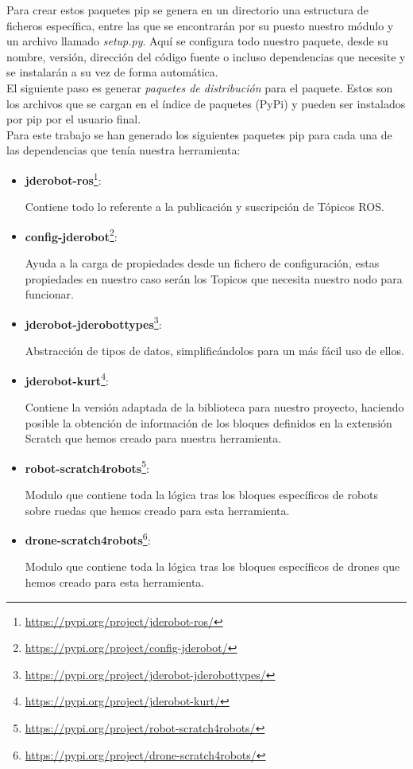Para crear estos paquetes pip se genera en un directorio una estructura de ficheros específica, entre las que se encontrarán por su puesto nuestro módulo y un archivo llamado \textit{setup.py}. Aquí se configura todo nuestro paquete, desde su nombre, versión, dirección del código fuente o incluso dependencias que necesite y se instalarán a su vez de forma automática.\\

El siguiente paso es generar \textit{paquetes de distribución} para el paquete. Estos son los archivos que se cargan en el índice de paquetes (PyPi) y pueden ser instalados por pip por el usuario final.\\

Para este trabajo se han generado los siguientes paquetes pip para cada una de las dependencias que tenía nuestra herramienta:

\begin{itemize}
\item \textbf{jderobot-ros}\footnote{\url{https://pypi.org/project/jderobot-ros/}}:

Contiene todo lo referente a la publicación y suscripción de Tópicos ROS. 
\item \textbf{config-jderobot}\footnote{\url{https://pypi.org/project/config-jderobot/}}:

Ayuda a la carga de propiedades desde un fichero de configuración, estas propiedades en nuestro caso serán los Topicos que necesita nuestro nodo para funcionar. 
\item \textbf{jderobot-jderobottypes}\footnote{\url{https://pypi.org/project/jderobot-jderobottypes/}}:

Abstracción de tipos de datos, simplificándolos para un más fácil uso de ellos.
\item \textbf{jderobot-kurt}\footnote{\url{https://pypi.org/project/jderobot-kurt/}}:

Contiene la versión adaptada de la biblioteca para nuestro proyecto, haciendo posible la obtención de información de los bloques definidos en la extensión Scratch que hemos creado para nuestra herramienta.
\item \textbf{robot-scratch4robots}\footnote{\url{https://pypi.org/project/robot-scratch4robots/}}:

Modulo que contiene toda la lógica tras los bloques específicos de robots sobre ruedas que hemos creado para esta herramienta.
\item \textbf{drone-scratch4robots}\footnote{\url{https://pypi.org/project/drone-scratch4robots/}}:

Modulo que contiene toda la lógica tras los bloques específicos de drones que hemos creado para esta herramienta.
\end{itemize}


